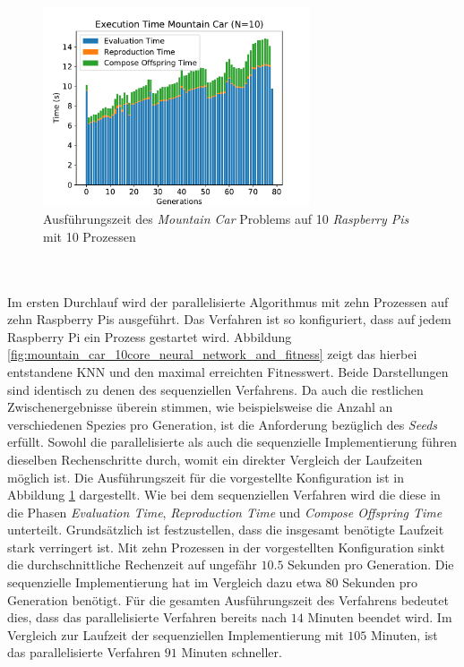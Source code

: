 \begin{figure}[!h]
	\centering
	\includegraphics[width=0.7\textwidth]{./img/mountain_car_analysis/1413_time_10cores_10pis.pdf} 
	\caption{Ausführungszeit des \emph{Mountain Car} Problems auf 10 \emph{Raspberry Pis} mit 10 Prozessen}
	\label{fig:mountain_car_time_10cores_10pi}
\end{figure}
\\\\
Im ersten Durchlauf wird der parallelisierte Algorithmus mit zehn Prozessen auf zehn Raspberry Pis ausgeführt. Das Verfahren ist so konfiguriert, dass auf jedem Raspberry Pi ein Prozess gestartet wird. Abbildung \ref{fig:mountain_car_10core_neural_network_and_fitness} zeigt das hierbei entstandene \ac{KNN} und den maximal erreichten Fitnesswert. Beide Darstellungen sind identisch zu denen des sequenziellen Verfahrens. Da auch die restlichen Zwischenergebnisse überein stimmen, wie beispielsweise die Anzahl an verschiedenen Spezies pro Generation, ist die Anforderung bezüglich des \emph{Seeds} erfüllt. Sowohl die parallelisierte als auch die sequenzielle Implementierung führen dieselben Rechenschritte durch, womit ein direkter Vergleich der Laufzeiten möglich ist. Die Ausführungszeit für die vorgestellte Konfiguration ist in Abbildung  \ref{fig:mountain_car_time_10cores_10pi} dargestellt. Wie bei dem sequenziellen Verfahren wird die diese in die Phasen \emph{Evaluation Time}, \emph{Reproduction Time} und \emph{Compose Offspring Time} unterteilt. Grundsätzlich ist festzustellen, dass die insgesamt benötigte Laufzeit stark verringert ist. Mit zehn Prozessen in der vorgestellten Konfiguration sinkt die durchschnittliche Rechenzeit auf ungefähr $10.5$ Sekunden pro Generation. Die sequenzielle Implementierung hat im Vergleich dazu etwa $80$ Sekunden pro Generation benötigt. Für die gesamten Ausführungszeit des Verfahrens bedeutet dies, dass das parallelisierte Verfahren bereits nach $14$ Minuten beendet wird. Im Vergleich zur Laufzeit der sequenziellen Implementierung mit $105$ Minuten, ist das parallelisierte Verfahren $91$ Minuten schneller.
